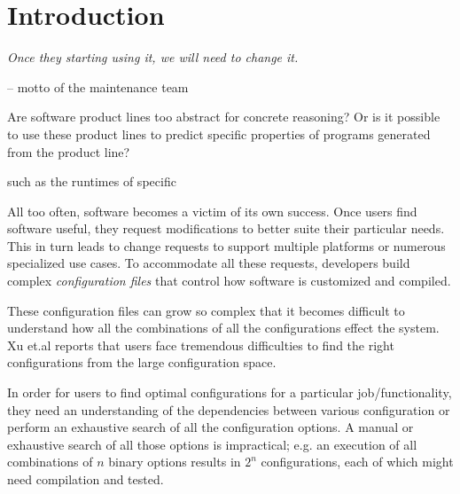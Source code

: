 \documentclass{sig-alternative}
\begin{document}
 

 
\section{Introduction}

\begin{raggedleft}
{\em Once  they starting using  it, we will need to  change  it.

-- motto of the maintenance team}

\end{raggedleft}
Are software  product lines too abstract for concrete reasoning?
Or is it possible to use these product lines to predict specific properties 
of programs generated from the product line?  

such
as the runtimes of specific




All too often,
 software becomes  a victim of its own success.
 Once users find software useful, they request modifications to better suite
 their particular needs.
 This in turn leads to change requests to support multiple platforms or
 numerous specialized use cases. 
 To accommodate all these  requests,
 developers build complex {\em configuration files} that 
 control how software is customized and compiled. 
 
 These configuration
 files can grow so complex that it becomes difficult
 to understand how all the combinations of all the 
 configurations effect the system\cite{berger2013study}. 
Xu et.al \cite{xu2015hey} reports that users face tremendous difficulties to find the right configurations from the large configuration space. 

 In order for  users to find  optimal configurations for a particular job/functionality, they need an understanding of the dependencies between various configuration or perform an exhaustive search of all the configuration options. 
 A manual or exhaustive search of all those options
 is impractical; e.g.    an execution of all combinations of
 $n$ binary options results in  $2^n$   configurations, each of which might need compilation and tested. 
 
\end{document}
